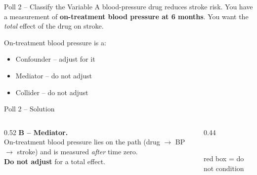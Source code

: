 \documentclass[aspectratio=169]{beamer}
\begin{document}
\begin{frame}{Poll 2 \;--\; Classify the Variable}
  \small
  A blood-pressure drug reduces stroke risk. You have a measurement of
  \textbf{on-treatment blood pressure at 6 months}. You want the
  \emph{total} effect of the drug on stroke.
  \vspace{0.8em}

  On-treatment blood pressure is a:
  \begin{itemize}
    \item[\textbf{A.}] Confounder -- adjust for it
    \item[\textbf{B.}] Mediator -- do not adjust
    \item[\textbf{C.}] Collider -- do not adjust
  \end{itemize}
\end{frame}

\begin{frame}{Poll 2 \;--\; Solution}
  \small
  \begin{columns}[T]
    \begin{column}{0.52\textwidth}
      \textcolor{good}{\textbf{B -- Mediator.}}\\[0.4em]
      On-treatment blood pressure lies on the path (drug $\to$ BP $\to$ stroke)
      and is measured \emph{after} time zero.\\[0.4em]
      \textcolor{brick}{\textbf{Do not adjust}} for a total effect.
    \end{column}
    \begin{column}{0.44\textwidth}
      \centering
      \\[0.3em]
      {\scriptsize\textcolor{brick}{red box = do not condition}}
    \end{column}
  \end{columns}
\end{frame}
\end{document}
